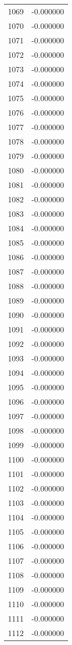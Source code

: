 \documentclass[12pt]{article}
\begin{document}
\begin{longtable}{@{}cc@{}}
1069 & -0.000000 \\
1070 & -0.000000 \\
1071 & -0.000000 \\
1072 & -0.000000 \\
1073 & -0.000000 \\
1074 & -0.000000 \\
1075 & -0.000000 \\
1076 & -0.000000 \\
1077 & -0.000000 \\
1078 & -0.000000 \\
1079 & -0.000000 \\
1080 & -0.000000 \\
1081 & -0.000000 \\
1082 & -0.000000 \\
1083 & -0.000000 \\
1084 & -0.000000 \\
1085 & -0.000000 \\
1086 & -0.000000 \\
1087 & -0.000000 \\
1088 & -0.000000 \\
1089 & -0.000000 \\
1090 & -0.000000 \\
1091 & -0.000000 \\
1092 & -0.000000 \\
1093 & -0.000000 \\
1094 & -0.000000 \\
1095 & -0.000000 \\
1096 & -0.000000 \\
1097 & -0.000000 \\
1098 & -0.000000 \\
1099 & -0.000000 \\
1100 & -0.000000 \\
1101 & -0.000000 \\
1102 & -0.000000 \\
1103 & -0.000000 \\
1104 & -0.000000 \\
1105 & -0.000000 \\
1106 & -0.000000 \\
1107 & -0.000000 \\
1108 & -0.000000 \\
1109 & -0.000000 \\
1110 & -0.000000 \\
1111 & -0.000000 \\
1112 & -0.000000 \\

\end{longtable}
\end{document}
